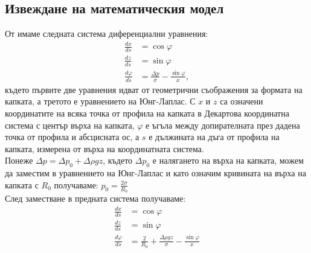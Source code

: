 \documentclass{article}
\begin{document}
\subsection{Извеждане на математическия модел}
От \cite{ASDA_report} имаме следната система диференциални уравнения:
\begin{align*}
\frac {dx}{ds} &= \cos \varphi\\
\frac {dz}{ds} &= \sin \varphi\\
\frac {d\varphi}{ds} &= \frac{\Delta p}{\sigma} - \frac{\sin \varphi}{x},
\end{align*}
където първите две уравнения идват от геометрични съображения за формата на капката, а третото е уравнението на Юнг-Лаплас. С \(x\) и \(z\) са означени координатите на всяка точка от профила на капката в Декартова координатна система с център върха на капката, \(\varphi\) е ъгъла между допирателната през дадена точка от профила и абсцисната ос, а \(s\) е дължината на дъга от профила на капката, измерена от върха на координатната система.\\

Понеже $\Delta p = \Delta p_0 + \Delta \rho gz$, където $\Delta p_0$ е налягането на върха на капката, можем да заместим в уравнението на Юнг-Лаплас и като означим кривината на върха на капката с $R_0$ получаваме: $p_0 = \frac{2\sigma}{R_0}$\\
След заместване в предната система получаваме:
\begin{align*}
\frac {dx}{ds} &= \cos \varphi\\
\frac {dz}{ds} &= \sin \varphi\\
\frac {d\varphi}{ds} &= \frac {2} {R_0}  + \frac{\Delta \rho gz}{\sigma} - \frac{\sin \varphi}{x}
\end{align*}
\end{document}
